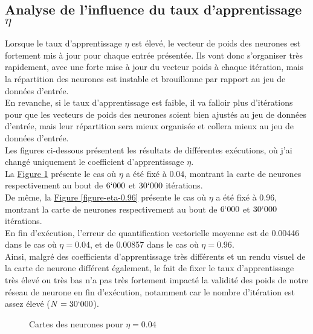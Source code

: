 \documentclass{article}
\begin{document}
\subsection{Analyse de l'influence du taux d'apprentissage $\eta$}
Lorsque le taux d'apprentissage $\eta$ est élevé, le vecteur de poids des neurones est fortement mis à jour pour chaque entrée présentée. Ils vont donc s'organiser très rapidement, avec une forte mise à jour du vecteur poids à chaque itération, mais la répartition des neurones est instable et brouillonne par rapport au jeu de données d'entrée.\\
En revanche, si le taux d'apprentissage est faible, il va falloir plus d'itérations pour que les vecteurs de poids des neurones soient bien ajustés au jeu de données d'entrée, mais leur répartition sera mieux organisée et collera mieux au jeu de données d'entrée.\\
Les figures ci-dessous présentent les résultats de différentes exécutions, où j'ai changé uniquement le coefficient d'apprentissage $\eta$.\\
La \hyperlink{figure-eta-0.04}{Figure \ref{figure-eta-0.04}} présente le cas où $\eta$ a été fixé à $0.04$, montrant la carte de neurones respectivement au bout de $6`000$ et $30`000$ itérations. \\
De même, la \hyperlink{figure-eta-0.96}{Figure \ref{figure-eta-0.96}} présente le cas où $\eta$ a été fixé à $0.96$, montrant la carte de neurones respectivement au bout de $6`000$ et $30`000$ itérations. \\
En fin d'exécution, l'erreur de quantification vectorielle moyenne est de 0.00446 dans le cas où $\eta = 0.04$, et de 0.00857 dans le cas où $\eta = 0.96$.\\
Ainsi, malgré des coefficients d'apprentissage très différents et un rendu visuel de la carte de neurone différent également, le fait de fixer le taux d'apprentissage très élevé ou très bas n'a pas très fortement impacté la validité des poids de notre réseau de neurone en fin d'exécution, notamment car le nombre d'itération est assez élevé ($N = 30`000$).\\

\begin{figure}[H]
    \centering
    \hypertarget{figure-eta-0.04}{}
    \caption{Cartes des neurones pour $\eta = 0.04$}
    \label{figure-eta-0.04}
\end{figure}
\end{document}
